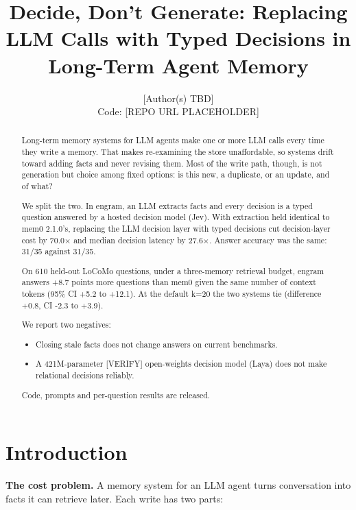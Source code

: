 \documentclass[11pt]{article}
\title{\textbf{Decide, Don't Generate: Replacing LLM Calls with Typed Decisions in Long-Term Agent Memory}}
\author{[Author(s) TBD]\\\small Code: [REPO URL PLACEHOLDER]}
\date{}
\newcommand{\src}[1]{}
\begin{document}
\maketitle
\begin{abstract}
Long-term memory systems for LLM agents make one or more LLM calls every time they write a memory. That makes re-examining the store unaffordable, so systems drift toward adding facts and never revising them. Most of the write path, though, is not generation but choice among fixed options: is this new, a duplicate, or an update, and of what?

We split the two. In engram, an LLM extracts facts and every decision is a typed question answered by a hosted decision model (Jev). With extraction held identical to mem0 2.1.0's, replacing the LLM decision layer with typed decisions cut decision-layer cost by 70.0$\times$\src{bench/results/e2_llm__dev.json ÷ bench/results/e2_jev__dev.json} and median decision latency by 27.6$\times$\src{bench/results/e2_llm__dev.json ÷ bench/results/e2_jev__dev.json}. Answer accuracy was the same: 31/35\src{bench/results/e2_jev__dev.json} against 31/35\src{bench/results/e2_llm__dev.json}.

On 610\src{bench/results/heldout_report.json} held-out LoCoMo questions, under a three-memory retrieval budget, engram answers +8.7\src{bench/results/mem0_token_matched__heldout_pooled__k6.json} points more questions than mem0 given the same number of context tokens (95\% CI +5.2\src{bench/results/mem0_token_matched__heldout_pooled__k6.json} to +12.1\src{bench/results/mem0_token_matched__heldout_pooled__k6.json}). At the default k=20 the two systems tie (difference +0.8\src{bench/results/heldout_report.json}, CI -2.3\src{bench/results/heldout_report.json} to +3.9\src{bench/results/heldout_report.json}).

We report two negatives:

\begin{itemize}
\item Closing stale facts does not change answers on current benchmarks.
\item A 421M-parameter [VERIFY] open-weights decision model (Laya) does not make relational decisions reliably.
\end{itemize}
Code, prompts and per-question results are released.

\end{abstract}
\section{Introduction}
\textbf{The cost problem.} A memory system for an LLM agent turns conversation into facts it can retrieve later. Each write has two parts:
\end{document}
